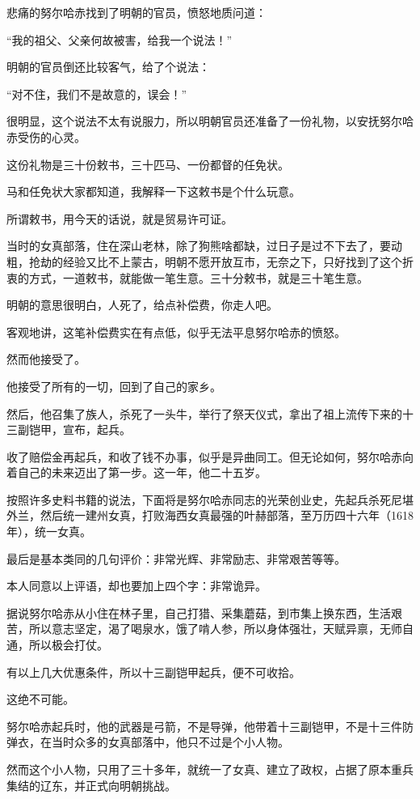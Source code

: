 \begin{multicols}{\theparacolNo}
悲痛的努尔哈赤找到了明朝的官员，愤怒地质问道：

“我的祖父、父亲何故被害，给我一个说法！”

明朝的官员倒还比较客气，给了个说法：

“对不住，我们不是故意的，误会！”

很明显，这个说法不太有说服力，所以明朝官员还准备了一份礼物，以安抚努尔哈赤受伤的心灵。

这份礼物是三十份敕书，三十匹马、一份都督的任免状。

马和任免状大家都知道，我解释一下这敕书是个什么玩意。

所谓敕书，用今天的话说，就是贸易许可证。

当时的女真部落，住在深山老林，除了狗熊啥都缺，过日子是过不下去了，要动粗，抢劫的经验又比不上蒙古，明朝不愿开放互市，无奈之下，只好找到了这个折衷的方式，一道敕书，就能做一笔生意。三十分敕书，就是三十笔生意。

明朝的意思很明白，人死了，给点补偿费，你走人吧。

客观地讲，这笔补偿费实在有点低，似乎无法平息努尔哈赤的愤怒。

然而他接受了。

他接受了所有的一切，回到了自己的家乡。

然后，他召集了族人，杀死了一头牛，举行了祭天仪式，拿出了祖上流传下来的十三副铠甲，宣布，起兵。

收了赔偿金再起兵，和收了钱不办事，似乎是异曲同工。但无论如何，努尔哈赤向着自己的未来迈出了第一步。这一年，他二十五岁。

按照许多史料书籍的说法，下面将是努尔哈赤同志的光荣创业史，先起兵杀死尼堪外兰，然后统一建州女真，打败海西女真最强的叶赫部落，至万历四十六年（1618年），统一女真。

最后是基本类同的几句评价：非常光辉、非常励志、非常艰苦等等。

本人同意以上评语，却也要加上四个字：非常诡异。

据说努尔哈赤从小住在林子里，自己打猎、采集蘑菇，到市集上换东西，生活艰苦，所以意志坚定，渴了喝泉水，饿了啃人参，所以身体强壮，天赋异禀，无师自通，所以极会打仗。

有以上几大优惠条件，所以十三副铠甲起兵，便不可收拾。

这绝不可能。

努尔哈赤起兵时，他的武器是弓箭，不是导弹，他带着十三副铠甲，不是十三件防弹衣，在当时众多的女真部落中，他只不过是个小人物。

然而这个小人物，只用了三十多年，就统一了女真、建立了政权，占据了原本重兵集结的辽东，并正式向明朝挑战。


\end{multicols}
